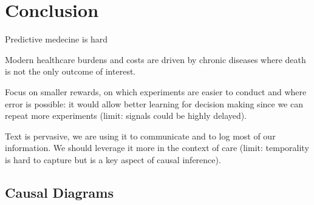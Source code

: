 \documentclass{report}
\begin{document}
\chapter{Conclusion}


Predictive medecine is hard

Modern healthcare burdens and costs are driven by chronic diseases where death
is not the only outcome of interest.

Focus on smaller rewards, on which experiments are easier to conduct and where
error is possible: it would allow better learning for decision making since we
can repeat more experiments (limit: signals could be highly delayed).

Text is pervasive, we are using it to communicate and to log most of our
information. We should leverage it more in the context of care (limit:
temporality is hard to capture but is a key aspect of causal inference).

\printbibliography

\appendix

\clearpage

\section{Causal Diagrams}
\end{document}
